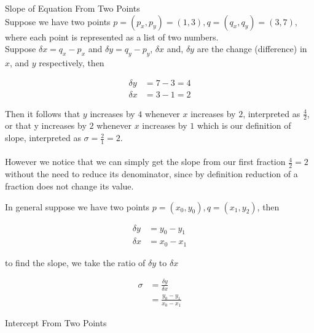 \documentclass{book}
\begin{document}
  {\example Slope of Equation From Two Points \\
    Suppose we have two points $p = (p_x, p_y) = (1, 3), q = (q_x, q_y) = (3, 7)$, where each point is represented as a list of two numbers.\\

    Suppose $\delta x = q_x - p_x$ and $\delta y = q_y - p_y$, $\delta x$ and, $\delta y$ are the change (difference) in $x$, and $y$ respectively, then

    \begin{align*}
      \delta y & = 7 - 3 = 4\\
      \delta x & = 3 - 1 = 2
    \end{align*}

    Then it follows that $y$ increases by $4$ whenever $x$ increases by $2$, interpreted as $\displaystyle \frac{4}{2}$, or that y increases by $2$ whenever $x$ increases by $1$ which is our definition of slope, interpreted as $\displaystyle \sigma = \frac{2}{1} = 2$.\\\\

    However we notice that we can simply get the slope from our first fraction $\displaystyle \frac{4}{2} = 2$ without the need to reduce its denominator, since by definition reduction of a fraction does not change its value.

    In general suppose we have two points $p = (x_0, y_0), q = (x_1, y_2)$, then

    \begin{align*}
      \delta y & = y_0 - y_1\\
      \delta x & = x_0 - x_1
    \end{align*}

    to find the slope, we take the ratio of $\delta y$ to $\delta x$

    \begin{align*}
      \sigma & = \frac{\delta y}{\delta x}\\
      & = \frac{y_0 - y_1}{x_0 - x_1}
    \end{align*}
  }

  {\theorem Intercept From Two Points 

  }
\end{document}

